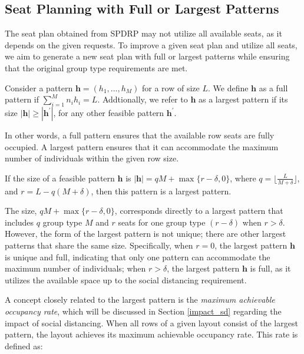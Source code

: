 \subsection{Seat Planning with Full or Largest Patterns}\label{seat_planning_full_largest}

The seat plan obtained from \textup{SPDRP} may not utilize all available seats, as it depends on the given requests. To improve a given seat plan and utilize all seats, we aim to generate a new seat plan with full or largest patterns while ensuring that the original group type requirements are met.

\begin{definition}
Consider a pattern $\bm{h} = (h_1, \ldots, h_M)$ for a row of size $L$. We define $\bm{h}$ as a full pattern if $\sum_{i=1}^{M} n_i h_i = L$. Addtionally, we refer to $\bm{h}$ as a largest pattern if its size $|\bm{h}| \geq |\bm{h}^{\prime}|$, for any other feasible pattern $\bm{h}^{\prime}$.
\end{definition}

In other words, a full pattern ensures that the available row seats are fully occupied. A largest pattern ensures that it can accommodate the maximum number of individuals within the given row size.

\begin{prop}\label{lem_pattern}
If the size of a feasible pattern $\bm{h}$ is $|\bm{h}| = qM + \max\{r-\delta, 0\}$, where $q = \lfloor \frac{L}{M + \delta} \rfloor$, and $r = L - q (M + \delta)$, then this pattern is a largest pattern.
\end{prop}

The size, $qM + \max\{r-\delta, 0\}$, corresponds directly to a largest pattern that includes $q$ group type $M$ and $r$ seats for one group type $(r-\delta)$ when $r>\delta$. However, the form of the largest pattern is not unique; there are other largest patterns that share the same size. Specifically, when $r = 0$, the largest pattern $\bm{h}$ is unique and full, indicating that only one pattern can accommodate the maximum number of individuals; when $r > \delta$, the largest pattern $\bm{h}$ is full, as it utilizes the available space up to the social distancing requirement.

A concept closely related to the largest pattern is the \textit{maximum achievable occupancy rate}, which will be discussed in Section \ref{impact_sd} regarding the impact of social distancing. When all rows of a given layout consist of the largest pattern, the layout achieves its maximum achievable occupancy rate. This rate is defined as:

